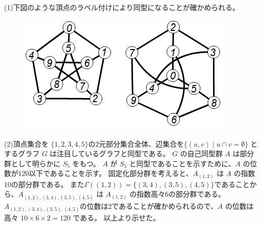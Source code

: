 \subsection{}
(1)下図のような頂点のラベル付けにより同型になることが確かめられる。
\begin{figure}[htbp]
  \includegraphics{chap1/fig1A1.png}
\end{figure}

(2)頂点集合を $\{1,2,3,4,5\}$の2元部分集合全体、辺集合を$\{(u,v) \mid u\cap v = \emptyset\}$ とするグラフ $G$ は注目しているグラフと同型である。
$G$ の自己同型群 $A$ は部分群として明らかに $S_5$ をもつ。
$A$ が $S_5$ と同型であることを示すために、$A$ の位数が120以下であることを示す。
固定化部分群を考えると、$A_{(1,2)}$ は $A$ の指数10の部分群である。
また$\Gamma((1,2))=\{(3,4),(3,5),(4,5)\}$であることから、$A_{(1,2),(3,4),(3,5),(4,5)}$ は $A_{(1,2)}$ の指数高々6の部分群である。
$A_{(1,2),(3,4),(3,5),(4,5)}$の位数は2であることが確かめられるので、$A$ の位数は高々 $10\times 6\times 2 =120$ である。
以上より示せた。
